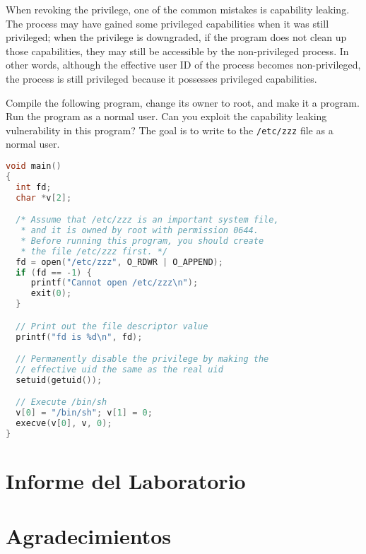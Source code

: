 When revoking the privilege, one of the common mistakes is capability
leaking. The process may have gained some privileged capabilities when it
was still privileged; when the privilege is downgraded, if the program
does not clean up those capabilities, they may still be accessible by the
non-privileged process. In other words, although the effective user ID of
the process becomes non-privileged, the process is still privileged because
it possesses privileged capabilities.

Compile the following program, change its owner to root, and
make it a \setuid program. Run the program as a normal user.
Can you exploit the capability leaking vulnerability in this program?
The goal is to write to the {\tt /etc/zzz} file as a normal user.

\begin{lstlisting}[language=C, caption=\texttt{cap\_leak.c}]
void main()
{
  int fd;
  char *v[2];

  /* Assume that /etc/zzz is an important system file,
   * and it is owned by root with permission 0644.
   * Before running this program, you should create
   * the file /etc/zzz first. */
  fd = open("/etc/zzz", O_RDWR | O_APPEND);
  if (fd == -1) {
     printf("Cannot open /etc/zzz\n");
     exit(0);
  }

  // Print out the file descriptor value
  printf("fd is %d\n", fd);

  // Permanently disable the privilege by making the
  // effective uid the same as the real uid
  setuid(getuid());

  // Execute /bin/sh
  v[0] = "/bin/sh"; v[1] = 0;
  execve(v[0], v, 0);
}
\end{lstlisting}



\section{Informe del Laboratorio}



\section*{Agradecimientos}





